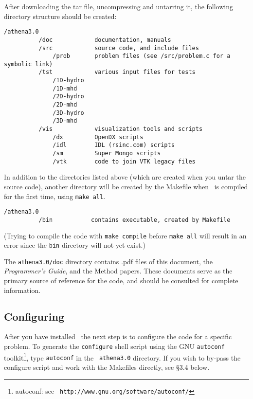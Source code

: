 After downloading the tar file, uncompressing and untarring it,
the following directory structure should be created:

\begin{verbatim}
/athena3.0
          /doc            documentation, manuals
          /src            source code, and include files
              /prob       problem files (see /src/problem.c for a symbolic link)
          /tst            various input files for tests
              /1D-hydro
              /1D-mhd
              /2D-hydro
              /2D-mhd
              /3D-hydro
              /3D-mhd
          /vis            visualization tools and scripts
              /dx         OpenDX scripts
              /idl        IDL (rsinc.com) scripts
              /sm         Super Mongo scripts
              /vtk        code to join VTK legacy files
\end{verbatim}
In addition to the directories listed above (which are created when you
untar the source code), another directory will be created by the Makefile
when \ath\ is compiled for the first time, using {\tt make all}.

\begin{verbatim}
/athena3.0
          /bin           contains executable, created by Makefile
\end{verbatim}
(Trying to compile the code with {\tt make compile} before
{\tt make all} will result in an error since the {\tt bin} directory will
not yet exist.)

The {\tt athena3.0/doc} directory contains .pdf files of this document,
the {\em Programmer's Guide}, and the Method papers.  These documents serve as
the primary source of reference for the code, and should be consulted for
complete information.

\subsection{Configuring \ath}

After you have installed \ath\, the next step is to configure the
code for a specific problem.  To generate the {\tt configure} shell
script using the GNU {\tt autoconf} toolkit\footnote{autoconf: see {\tt
http://www.gnu.org/software/autoconf/}}, type {\tt autoconf} in the {\tt
athena3.0} directory.  If you wish to by-pass the configure script and work
with the Makefiles directly, see \S 3.4 below.

